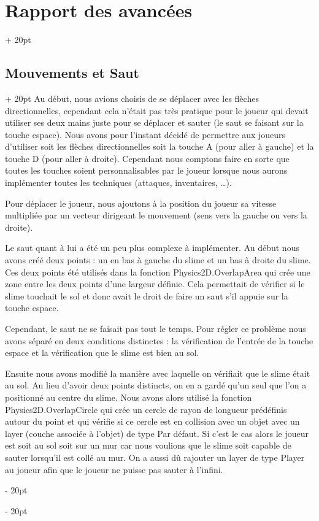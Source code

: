 \documentclass[a4paper, 12pt, twoside]{article}
\newcommand{\ind}[1][20pt]{\advance\leftskip + #1}
\newcommand{\deind}[1][20pt]{\advance\leftskip - #1}
\newenvironment{indt}[2][20pt]{#2 \par \ind[#1]}{\par \deind} %
\begin{document}
\begin{indt}{\section{Rapport des avancées}}
        \begin{indt}{\subsection{Mouvements et Saut}}
            Au début, nous avions choisis de se déplacer avec les flèches directionnelles, cependant cela n'était pas très pratique pour le joueur qui devait utiliser ses deux mains juste pour se déplacer et sauter (le saut se faisant sur la touche espace). Nous avons pour l'instant décidé de permettre aux joueurs d'utiliser soit les flèches directionnelles soit la touche A (pour aller à gauche) et la touche D (pour aller à droite). Cependant nous comptons faire en sorte que toutes les touches soient personnalisables par le joueur lorsque nous aurons implémenter toutes les techniques (attaques, inventaires, …).

            Pour déplacer le joueur, nous ajoutons à la position du joueur sa vitesse multipliée par un vecteur dirigeant le mouvement (sens vers la gauche ou vers la droite).

            Le saut quant à lui a été un peu plus complexe à implémenter. Au début nous avons créé deux points : un en bas à gauche du slime et un bas à droite du slime. Ces deux points été utilisés dans la fonction Physics2D.OverlapArea qui crée une zone entre les deux points d'une largeur définie. Cela permettait de vérifier si le slime touchait le sol et donc avait le droit de faire un saut s'il appuie sur la touche espace. 

            Cependant, le saut ne se faisait pas tout le temps. Pour régler ce problème nous avons séparé en deux conditions distinctes : la vérification de l'entrée de la touche espace et la vérification que le slime est bien au sol. 

            Ensuite nous avons modifié la manière avec laquelle on vérifiait que le slime était au sol. Au lieu d'avoir deux points distincts, on en a gardé qu'un seul que l'on a positionné au centre du slime. Nous avons alors utilisé la fonction Physics2D.OverlapCircle qui crée un cercle de rayon de longueur prédéfinis autour du point et qui vérifie si ce cercle est en collision avec un objet avec un layer (couche associée à l'objet) de type Par défaut. Si c'est le cas alors le joueur est soit au sol soit sur un mur car nous voulions que le slime soit capable de sauter lorsqu'il est collé au mur. On a aussi dû rajouter un layer de type Player au joueur afin que le joueur ne puisse pas sauter à l'infini. 


\end{indt}
\end{indt}
\end{document}
